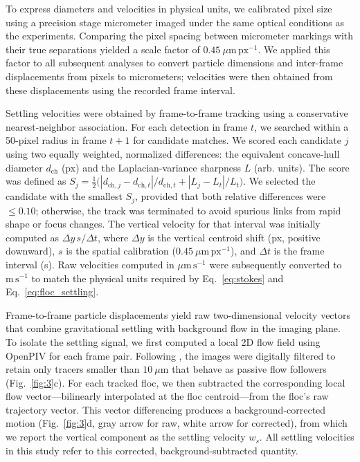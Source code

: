 \documentclass{agujournal2019}
\begin{document}
To express diameters and velocities in physical units, we calibrated pixel size using a precision stage micrometer imaged under the same optical conditions as the experiments. Comparing the pixel spacing between micrometer markings with their true separations yielded a scale factor of \(0.45~\mu\mathrm{m\,px^{-1}}\). We applied this factor to all subsequent analyses to convert particle dimensions and inter-frame displacements from pixels to micrometers; velocities were then obtained from these displacements using the recorded frame interval.

Settling velocities were obtained by frame-to-frame tracking using a conservative nearest-neighbor association. For each detection in frame \(t\), we searched within a 50-pixel radius in frame \(t{+}1\) for candidate matches. We scored each candidate \(j\) using two equally weighted, normalized differences: the equivalent concave-hull diameter \(d_{\mathrm{ch}}\) (px) and the Laplacian-variance sharpness \(L\) (arb. units). The score was defined as \(S_j=\tfrac{1}{2}\big(|d_{\mathrm{ch},j}-d_{\mathrm{ch},t}|/d_{\mathrm{ch},t}+|L_j-L_t|/L_t\big)\). We selected the candidate with the smallest \(S_j\), provided that both relative differences were \(\le 0.10\); otherwise, the track was terminated to avoid spurious links from rapid shape or focus changes. The vertical velocity for that interval was initially computed as \(\Delta y\,s/\Delta t\), where \(\Delta y\) is the vertical centroid shift (px, positive downward), \(s\) is the spatial calibration (\(0.45~\mu\mathrm{m\,px^{-1}}\)), and \(\Delta t\) is the frame interval (s). Raw velocities computed in \(\mu\mathrm{m\,s^{-1}}\) were subsequently converted to \(\mathrm{m\,s^{-1}}\) to match the physical units required by Eq.~\eqref{eq:stokes} and Eq.~\eqref{eq:floc_settling}.

Frame-to-frame particle displacements yield raw two-dimensional velocity vectors that combine gravitational settling with background flow in the imaging plane. To isolate the settling signal, we first computed a local 2D flow field using OpenPIV \cite{liberzon2021openpiv} for each frame pair. Following , the images were digitally filtered to retain only tracers smaller than $10~\mu\mathrm{m}$ that behave as passive flow followers (Fig.~\ref{fig:3}c). For each tracked floc, we then subtracted the corresponding local flow vector---bilinearly interpolated at the floc centroid---from the floc's raw trajectory vector. This vector differencing produces a background-corrected motion (Fig.~\ref{fig:3}d, gray arrow for raw, white arrow for corrected), from which we report the vertical component as the settling velocity \(w_s\). All settling velocities in this study refer to this corrected, background-subtracted quantity.
\end{document}

